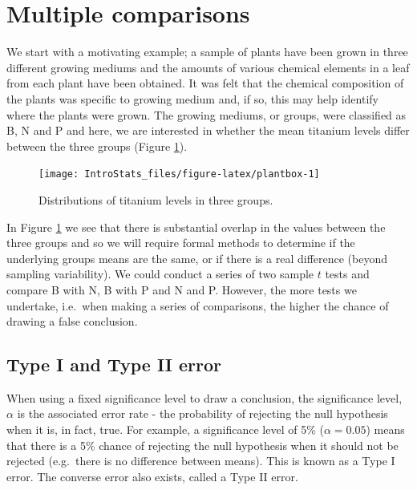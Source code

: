 \documentclass[
  oneside]{krantz}
\begin{document}
\hypertarget{multiple-comparisons}{%
\section{Multiple comparisons}\label{multiple-comparisons}}

We start with a motivating example; a sample of plants have been grown in three different growing mediums and the amounts of various chemical elements in a leaf from each plant have been obtained. It was felt that the chemical composition of the plants was specific to growing medium and, if so, this may help identify where the plants were grown. The growing mediums, or groups, were classified as B, N and P and here, we are interested in whether the mean titanium levels differ between the three groups (Figure \ref{fig:plantbox}).

\begin{figure}

{\centering \texttt{[image: IntroStats\_files/figure-latex/plantbox-1]} 

}

\caption{Distributions of titanium levels in three groups.}\label{fig:plantbox}
\end{figure}

In Figure \ref{fig:plantbox} we see that there is substantial overlap in the values between the three groups and so we will require formal methods to determine if the underlying groups means are the same, or if there is a real difference (beyond sampling variability). We could conduct a series of two sample \(t\) tests and compare B with N, B with P and N and P. However, the more tests we undertake, i.e.~when making a series of comparisons, the higher the chance of drawing a false conclusion.

\hypertarget{type-i-and-type-ii-error}{%
\subsection{Type I and Type II error}\label{type-i-and-type-ii-error}}

When using a fixed significance level to draw a conclusion, the significance level, \(\alpha\) is the associated error rate - the probability of rejecting the null hypothesis when it is, in fact, true. For example, a significance level of 5\% (\(\alpha=0.05\)) means that there is a 5\% chance of rejecting the null hypothesis when it should not be rejected (e.g.~there is no difference between means). This is known as a Type I error. The converse error also exists, called a Type II error.
\end{document}
